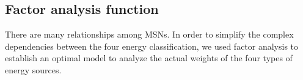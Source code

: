 \documentclass[a4paper,11pt]{article}
\begin{document}




\subsection{Factor analysis function}

\par There are many relationships among MSNs. In order to simplify the complex dependencies between the four energy classification, we used factor analysis to establish an optimal model to analyze the actual weights of the four types of energy sources.

\end{document}
